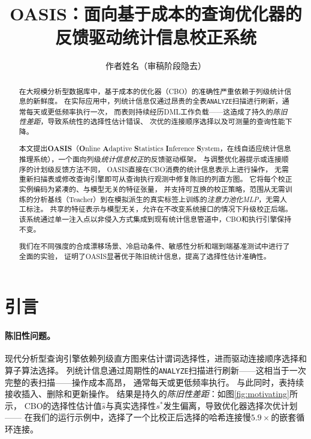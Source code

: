 \documentclass[runningheads]{llncs}
\begin{document}
\title{OASIS：面向基于成本的查询优化器的反馈驱动统计信息校正系统}

\author{作者姓名（审稿阶段隐去）}



\maketitle

\begin{abstract}
在大规模分析型数据库中，基于成本的优化器（CBO）的准确性严重依赖于列级统计信息的新鲜度。
在实际应用中，列统计信息仅通过昂贵的全表\texttt{ANALYZE}扫描进行刷新，通常每天或更低频率执行一次，
而表则持续经历DML工作负载——这造成了持久的\emph{陈旧性差距}，导致系统性的选择性估计错误、
次优的连接顺序选择以及可测量的查询性能下降。

本文提出\textbf{OASIS}（\textbf{O}nline \textbf{A}daptive \textbf{S}tatistics
\textbf{I}nference \textbf{S}ystem，在线自适应统计信息推理系统），一个面向列级\emph{统计信息校正}的反馈驱动框架。
与调整优化器提示或连接顺序的计划级反馈方法不同，
OASIS直接在CBO消费的统计信息表示上进行操作，
无需重新扫描表或修改查询引擎即可从查询执行观测中修复陈旧的列直方图。
它将每个校正实例编码为紧凑的、与模型无关的特征张量，
并支持可互换的校正策略，范围从无需训练的分析基线（Teacher）到在模拟派生的真实标签上训练的\emph{注意力池化MLP}，无需人工标注。
共享的特征表示与模型无关，允许在不改变系统接口的情况下升级校正后端。
该系统通过单一注入点以非侵入方式集成到现有统计信息管道中，CBO和执行引擎保持不变。

我们在不同强度的合成漂移场景、冷启动条件、敏感性分析和端到端基准测试中进行了全面的实验，
证明了OASIS显著优于陈旧统计信息，提高了选择性估计准确性。
\end{abstract}

\section{引言}
\label{sec:intro}

\paragraph{陈旧性问题。}
现代分析型查询引擎依赖列级直方图来估计谓词选择性，进而驱动连接顺序选择和算子算法选择。
列统计信息通过周期性的\texttt{ANALYZE}扫描进行刷新——这相当于一次完整的表扫描——操作成本高昂，
通常每天或更低频率执行。
与此同时，表持续接收插入、删除和更新操作。
结果是持久的\emph{陈旧性差距}：如图\ref{fig:motivating}所示，
CBO的选择性估计值$\hat{s}$与真实选择性$s^*$发生偏离，导致优化器选择次优计划——
在我们的运行示例中，选择了一个比校正后选择的哈希连接慢$5.9\times$的嵌套循环连接。
\end{document}

